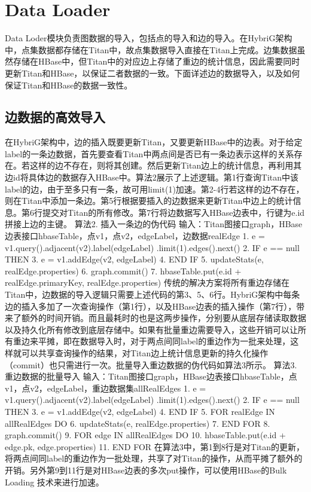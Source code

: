 
\chapter{Data Loader}
Data Loder模块负责图数据的导入，包括点的导入和边的导入。在HybriG架构中，点集数据都存储在Titan中，故点集数据导入直接在Titan上完成。边集数据虽然存储在HBase中，但Titan中的对应边上存储了重边的统计信息，因此需要同时更新Titan和HBase，以保证二者数据的一致。下面详述边的数据导入，以及如何保证Titan和HBase的数据一致性。

\section{边数据的高效导入}
在HybriG架构中，边的插入既要更新Titan，又要更新HBase中的边表。对于给定label的一条边数据，首先要查看Titan中两点间是否已有一条边表示这样的关系存在。若这样的边不存在，则将其创建。然后更新Titan边上的统计信息，再利用其边id将具体边的数据存入HBase中。算法2展示了上述逻辑。第1行查询Titan中该label的边，由于至多只有一条，故可用limit(1)加速。第2-4行若这样的边不存在，则在Titan中添加一条边。第5行根据要插入的边数据来更新Titan中边上的统计信息。第6行提交对Titan的所有修改。第7行将边数据写入HBase边表中，行键为e.id拼接上边的主键。
算法2.	插入一条边的伪代码
输入：Titan图接口graph，HBase边表接口hbaseTable，点v1，点v2，edgeLabel，边数据realEdge
1.	e = v1.query().adjacent(v2).label(edgeLabel)
.limit(1).edges().next()
2.	IF e == null THEN
3.	    e = v1.addEdge(v2, edgeLabel)
4.	END IF
5.	updateStats(e, realEdge.properties)
6.	graph.commit()
7.	hbaseTable.put(e.id + realEdge.primaryKey,
realEdge.properties)
传统的解决方案将所有重边存储在Titan中，边数据的导入逻辑只需要上述代码的第3、5、6行。HybriG架构中每条边的插入多加了一次查询操作（第1行），以及HBase边表的插入操作（第7行），带来了额外的时间开销。而且最耗时的也是这两步操作，分别要从底层存储读取数据以及持久化所有修改到底层存储中。如果有批量重边需要导入，这些开销可以让所有重边来平摊，即在数据导入时，对于两点间同label的重边作为一批来处理，这样就可以共享查询操作的结果，对Titan边上统计信息更新的持久化操作（commit）也只需进行一次。批量导入重边数据的伪代码如算法3所示。
算法3.	重边数据的批量导入
输入：Titan图接口graph，HBase边表接口hbaseTable，点v1，点v2，edgeLabel，重边数据集allRealEdges
1.	e = v1.query().adjacent(v2).label(edgeLabel)
.limit(1).edges().next()
2.	IF e == null THEN
3.	    e = v1.addEdge(v2, edgeLabel)
4.	END IF
5.	FOR realEdge IN allRealEdges DO
6.	     updateStats(e, realEdge.properties)
7.	END FOR
8.	graph.commit()
9.	FOR edge IN allRealEdges DO
10.	    hbaseTable.put(e.id + edge.pk, edge.properties)
11.	END FOR
在算法3中，第1到8行是对Titan的更新，将两点间同label的重边作为一批处理，共享了对Titan的操作，从而平摊了额外的开销。另外第9到11行是对HBase边表的多次put操作，可以使用HBase的Bulk Loading 技术来进行加速。

